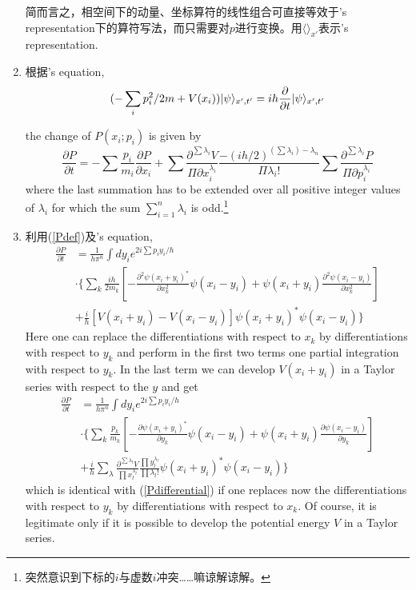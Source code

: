 \begin{enumerate}
 	简而言之，相空间下的动量、坐标算符的线性组合可直接等效于\sch's representation下的算符写法，而只需要对$p$进行变换。用$\langle \rangle_{x'}$表示\sch's representation.

 	\item 根据\sch's equation,
 	\begin{equation}
 	(-\sum_i p_i^2/2m + V(x_i))| \psi \rangle_{x',t'}=ih\frac{\partial}{\partial t}| \psi \rangle_{x',t'}
 	\end{equation}

 	the change of $P(x_i;p_i)$ is given by
 	\begin{equation}
 	\frac{\partial P}{\partial t}= - \sum \frac{p_i}{m_i}\frac{\partial P}{\partial x_i} + \sum \frac{\partial^{\sum \lambda_i}V}{\Pi \partial x_i^{\lambda_i}}\frac{-(ih/2)^{(\sum \lambda_i)-\lambda_n}}{\Pi \lambda_i!}\sum \frac{\partial^{\sum \lambda_i}P}{\Pi \partial p_i^{\lambda_i}}
 	\label{Pdifferential}
 	\end{equation}
 	where the last summation has to be extended over all positive integer values of $\lambda_i$ for which the sum $\sum_{i=1}^{n} \lambda_i$ is odd.\footnote{突然意识到下标的$i$与虚数$i$冲突……嘛谅解谅解。}

 	\item 利用(\ref{Pdef})及\sch's equation,
 	\begin{align*}
 	\frac{\partial P}{\partial t}& = \frac{1}{h\pi^n}\int dy_i e^{2i\sum p_iy_i/h}\\
 	&\cdot\{\sum_k \frac{ih}{2m_k}\left[-\frac{\partial^2\psi(x_i+y_i)^*}{\partial x_k^2}\psi(x_i-y_i)+\psi(x_i+y_i)\frac{\partial^2\psi(x_i-y_i)}{\partial x_k^2}\right]\\
 	&+\frac{i}{h}[V(x_i+y_i)-V(x_i-y_i)]\psi(x_i+y_i)^*\psi(x_i-y_i)\}
 	\end{align*}
 	Here one can replace the differentiations with respect to $x_k$ by differentiations with respect to $y_k$ and perform in the first two terms one partial integration with respect to $y_k$. In the last term we can develop $V(x_i+y_i)$ in a Taylor series with respect to the $y$ and get 
 	\begin{align*}
 	\frac{\partial P}{\partial t}& = \frac{1}{h\pi^n}\int dy_i e^{2i\sum p_iy_i/h}\\
 	&\cdot\{\sum_k \frac{p_k}{m_k}\left[-\frac{\partial\psi(x_i+y_i)^*}{\partial y_k}\psi(x_i-y_i)+\psi(x_i+y_i)\frac{\partial\psi(x_i-y_i)}{\partial y_k}\right]\\
 	&+\frac{i}{h}\sum_\lambda\frac{\partial^{\sum\lambda_l}V}{\prod x_l^{\lambda_l}}\frac{\prod y_l^{\lambda_l}}{\prod \lambda_l!}\psi(x_i+y_i)^*\psi(x_i-y_i)\}
 	\end{align*}
 	which is identical with (\ref{Pdifferential}) if one replaces now the differentiations with respect to $y_k$ by differentiations with respect to $x_k$. Of course, it is legitimate only if it is possible to develop the potential energy $V$ in a Taylor series.


\end{enumerate}
